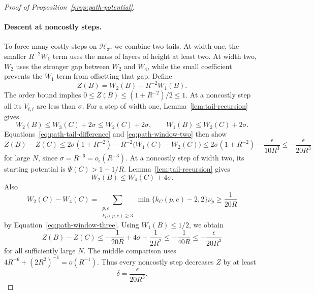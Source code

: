 \begin{proof}[Proof of Proposition~\ref{prop:path-potential}]
\paragraph{Descent at noncostly steps.}
To force many costly steps on \(\mathcal H_\pi\), we combine two tails.
At width one, the smaller \(R^{-2}W_1\) term uses the mass of layers of
height at least two. At width two, \(W_2\) uses the stronger gap between
\(W_2\) and \(W_4\), while the small coefficient prevents the \(W_1\)
term from offsetting that gap. Define
\[
 Z(B)=W_2(B)+R^{-2}W_1(B).
\]
The order bound implies \(0\le Z(B)\le(1+R^{-2})/2\le1\).
At a noncostly step all its \(V_{t,i}\) are less than \(\sigma\).
For a step of width one, Lemma~\ref{lem:tail-recursion} gives
\[
 W_2(B)\le W_3(C)+2\sigma\le W_2(C)+2\sigma,
 \qquad W_1(B)\le W_2(C)+2\sigma.
\]
Equations~\eqref{eq:path-tail-difference} and
\eqref{eq:path-window-two} then show
\[
 Z(B)-Z(C)
 \le2\sigma(1+R^{-2})
       -R^{-2}\bigl(W_1(C)-W_2(C)\bigr)
 \le2\sigma(1+R^{-2})-\frac{\epsilon}{10R^3}
 \le-\frac{\epsilon}{20R^3}
\]
for large \(N\), since \(\sigma=R^{-6}=o_\epsilon(R^{-3})\).
At a noncostly step of width two, its starting potential is
\(\Psi(C)>1-1/R\). Lemma~\ref{lem:tail-recursion} gives
\[
 W_2(B)\le W_4(C)+4\sigma.
\]
Also
\[
 W_2(C)-W_4(C)
 =\sum_{\substack{p,e\\k_C(p,e)\ge3}}
        \min\{k_C(p,e)-2,2\}\nu_p
 \ge\frac1{20R}
\]
by Equation~\eqref{eq:path-window-three}. Using \(W_1(B)\le1/2\),
we obtain
\[
 Z(B)-Z(C)
 \le-\frac1{20R}+4\sigma+\frac1{2R^2}
 \le-\frac1{40R}\le-\frac{\epsilon}{20R^3}
\]
for all sufficiently large \(N\). The middle comparison uses
\(4R^{-6}+(2R^2)^{-1}=o(R^{-1})\).
Thus every noncostly step decreases \(Z\) by at least
\[
 \delta=\frac{\epsilon}{20R^3}.
\]


\end{proof}
